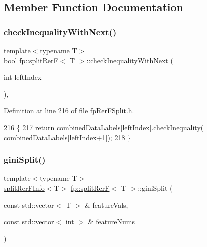 \subsection{Member Function Documentation}
\mbox{\label{classfp_1_1splitRerF_aee3b2a4912c569eeb5c2aea155ab48ab}} 
\subsubsection{\texorpdfstring{check\+Inequality\+With\+Next()}{checkInequalityWithNext()}}
{\footnotesize\ttfamily template$<$typename T$>$ \\
bool \hyperlink{classfp_1_1splitRerF}{fp\+::split\+RerF}$<$ T $>$\+::check\+Inequality\+With\+Next (\begin{DoxyParamCaption}\item[{int}]{left\+Index }\end{DoxyParamCaption})\hspace{0.3cm}{\ttfamily [inline]}, {\ttfamily [protected]}}



Definition at line 216 of file fp\+Rer\+F\+Split.\+h.


\begin{DoxyCode}
216                                                                   \{
217                     \textcolor{keywordflow}{return} \hyperlink{classfp_1_1splitRerF_a2ce4d0a7ae4ba4958ddcc1adba71b2c9}{combinedDataLabels}[leftIndex].checkInequality(
      \hyperlink{classfp_1_1splitRerF_a2ce4d0a7ae4ba4958ddcc1adba71b2c9}{combinedDataLabels}[leftIndex+1]);
218                 \}
\end{DoxyCode}
\mbox{\label{classfp_1_1splitRerF_a5b727300d091166f7a0044162491b1e9}} 
\subsubsection{\texorpdfstring{gini\+Split()}{giniSplit()}}
{\footnotesize\ttfamily template$<$typename T$>$ \\
\hyperlink{classfp_1_1splitRerFInfo}{split\+Rer\+F\+Info}$<$T$>$ \hyperlink{classfp_1_1splitRerF}{fp\+::split\+RerF}$<$ T $>$\+::gini\+Split (\begin{DoxyParamCaption}\item[{const std\+::vector$<$ T $>$ \&}]{feature\+Vals,  }\item[{const std\+::vector$<$ int $>$ \&}]{feature\+Nums }\end{DoxyParamCaption})\hspace{0.3cm}{\ttfamily [inline]}}



